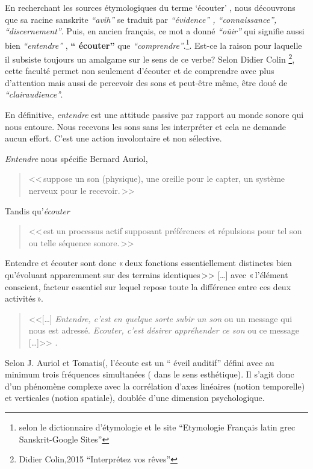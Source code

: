 En recherchant les sources étymologiques du
terme `écouter' , nous découvrons que 
 sa racine sanskrite \emph{ ``avih'' } se traduit par
 \emph{``évidence'' , ``connaissance'', ``discernement''}. Puis, en ancien
 français, ce mot a donné \textit{``oüir''} qui signifie aussi bien \textit{``entendre''} ,
\textbf{`` écouter'' } que \textit{``comprendre''}.\footnote{selon le dictionnaire d'étymologie et le site
  ``Etymologie Français latin grec Sanskrit-Google Sites'' }.
 Est-ce la raison
pour laquelle il subsiste toujours un amalgame 
sur le sens de ce verbe?
Selon Didier
Colin \footnote{Didier Colin,2015 ``Interprétez vos rêves''}, cette faculté
permet non seulement d'écouter et de comprendre avec plus d'attention
mais aussi de percevoir des sons et peut-être même, être doué de
\textit{``clairaudience'}'. 


En définitive, \emph{entendre} est une attitude passive par rapport au monde sonore
qui nous entoure. Nous recevons les sons sans les interpréter et cela
ne demande aucun effort. C'est une action involontaire et non
sélective.

\textit{Entendre} nous spécifie Bernard Auriol, \autocite[p. 2, ch . 1]{auriol:cle}
\begin{quote}
	<<\,suppose un son (physique), une oreille
	pour le capter, un système nerveux pour le recevoir.\,>>
\end{quote} 
Tandis qu'\textit{écouter} 
\begin{quote}
	<<\,est un
	processus actif supposant préférences et répulsions pour tel son ou
	telle séquence sonore.\,>>
\end{quote}


Entendre et écouter sont donc  «\,deux
fonctions essentiellement distinctes bien qu'évoluant apparemment sur
des terrains identiques\,>>
[\dots] avec «\,l'élément conscient, facteur essentiel sur lequel repose toute la
différence entre ces deux activités\,».\autocite[]{tomatis_oreille_1991}
\begin{quote}
	
	<<[\ldots] \emph{Entendre, c'est en quelque sorte subir
		un son} ou un message qui nous est adressé. \emph{Ecouter, c'est désirer appréhender ce son} ou ce message [\ldots]>>
	\autocite{tomatis:education}.	
\end{quote}

Selon J. Auriol \autocite[18] {auriol:cle} et Tomatis(\autocite[52]
{tomatis:loreille}, l'écoute est un `` éveil auditif''  défini avec au
minimum trois
fréquences simultanées ( dans le sens esthétique). Il s'agit donc d'un phénomène
complexe avec la corrélation d'axes
linéaires (notion temporelle) et verticales (notion spatiale), doublée d'une
dimension psychologique.

